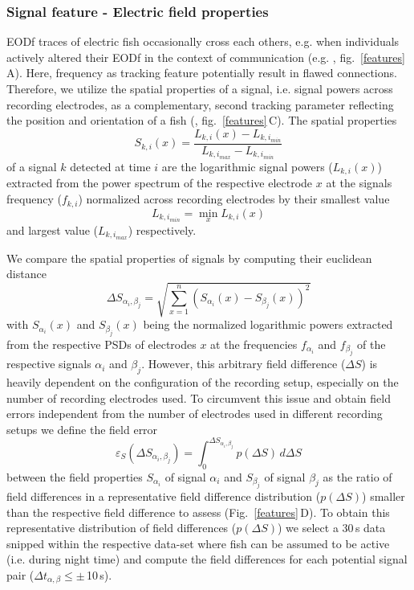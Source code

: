 \documentclass[11pt,pdftex]{article}
\newcommand{\panel}[1]{\textsf{#1}}
\newcommand{\subfref}[2]{\textup{\ref{#1}}\,\panel{#2}}
\newcommand{\fig}{Fig.}
\newcommand{\subfigref}[2]{\fig~\subfref{#1}{#2}}
\newcommand{\figb}{fig.}
\newcommand{\subfigrefb}[2]{\figb~\subfref{#1}{#2}}
\begin{document}
\subsubsection{Signal feature - Electric field properties}

EODf traces of electric fish occasionally cross each others, e.g. when individuals actively altered their EODf in the context of communication (e.g. \citealp{Zupanc2002, Triefenbach2008, Raab2021}, \subfigrefb{features}{A}). Here, frequency as tracking feature potentially result in flawed connections. Therefore, we utilize the spatial properties of a signal, i.e. signal powers across recording electrodes, as a complementary, second tracking parameter reflecting the position and orientation of a fish (\citealp{Madhav2018}, \subfigrefb{features}{C}). The spatial properties 
\begin{equation}\label{field_properties}
S_{k, i}(x) = \frac{L_{k, i}(x) - L_{k, i_{min}}}{L_{k, i_{max}} - L_{k, i_{min}}}
\end{equation}
of a signal $k$ detected at time $i$ are the logarithmic signal powers ($L_{k, i}(x)$) extracted from the power spectrum of the respective electrode $x$ at the signals frequency ($f_{k, i}$) normalized across recording electrodes by their smallest value 
\begin{equation}
L_{k, i_{min}} = \min_x L_{k, i}(x)
\end{equation}
and largest value ($L_{k, i_{max}}$) respectively. 

We compare the spatial properties of signals by computing their euclidean distance 
\begin{equation}\label{field_diff_eq}
  \Delta S_{\alpha_i, \beta_j} = \sqrt{\sum_{x=1}^{n} (S_{\alpha_i}(x) - S_{\beta_j}(x))^2}
\end{equation} 
with $S_{\alpha_i}(x)$ and $S_{\beta_j}(x)$ being the normalized logarithmic powers extracted from the respective PSDs of electrodes $x$ at the frequencies $f_{\alpha_i}$ and $f_{\beta_j}$ of the respective signals  $\alpha_i$ and $\beta_j$. However, this arbitrary field difference ($\Delta S$) is heavily dependent on the configuration of the recording setup, especially on the number of recording electrodes used. To circumvent this issue and obtain field errors independent from the number of electrodes used in different recording setups we define the field error 
\begin{equation}
\varepsilon_S(\Delta S_{\alpha_i, \beta_j}) = \int_0^{\Delta S_{\alpha_i, \beta_j}} p(\Delta S)\,d\Delta S
\end{equation}
 between the field properties $S_{\alpha_i}$ of signal $\alpha_i$ and $S_{\beta_j}$ of signal $\beta_j$ as the ratio of field differences in a representative field difference distribution ($p(\Delta S)$) smaller than the respective field difference to assess (\subfigref{features}{D}). To obtain this representative distribution of field differences ($p(\Delta S)$) we select a 30\,s data snipped within the respective data-set where fish can be assumed to be active (i.e. during night time) and compute the field differences for each potential signal pair ($\Delta t_{\alpha, \beta} \leq\pm$\,10\,s). 
\end{document}

